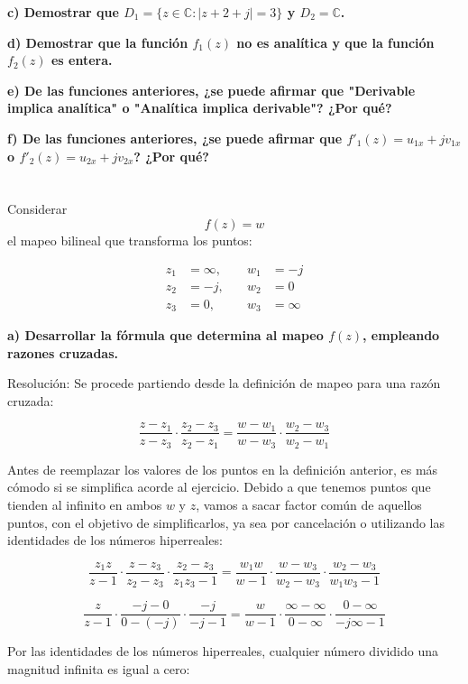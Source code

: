 \documentclass[12pt]{report}
\begin{document}
\textbf{c) Demostrar que $D_1 = \{z \in \mathbb{C} : |z + 2 + j| = 3\}$ y $D_2 = \mathbb{C}$.}

\textbf{d) Demostrar que la función $f_1(z)$ no es analítica y que la función $f_2(z)$ es entera.}

\textbf{e) De las funciones anteriores, ¿se puede afirmar que "Derivable implica analítica" o "Analítica implica derivable"? ¿Por qué?}

\textbf{f) De las funciones anteriores, ¿se puede afirmar que $f'_1(z) = u_{1x} + jv_{1x}$ o $f'_2(z) = u_{2x} + jv_{2x}$? ¿Por qué?}
\chapter{}

Considerar $$ f(z) = w $$ el mapeo bilineal que transforma los puntos:

\begin{align*}
    z_1 &= \infty, \quad & w_1 &= -j \\
    z_2 &= -j, \quad & w_2 &= 0 \\
    z_3 &= 0, \quad & w_3 &= \infty 
\end{align*}

\textbf{a) Desarrollar la fórmula que determina al mapeo \( f(z) \), empleando razones cruzadas.}

Resolución: Se procede partiendo desde la definición de mapeo para una razón cruzada:

$$ \frac{z - z_1}{z - z_3} \cdot \frac{z_2 - z_3}{z_2 - z_1} = \frac{w - w_1}{w - w_3} \cdot \frac{w_2 - w_3}{w_2 - w_1} $$

Antes de reemplazar los valores de los puntos en la definición anterior, es más cómodo si se simplifica acorde al ejercicio. Debido a que tenemos puntos que tienden al infinito en ambos \( w \) y \( z \), vamos a sacar factor común de aquellos puntos, con el objetivo de simplificarlos, ya sea por cancelación o utilizando las identidades de los números hiperreales:

$$ \frac{z_1z}{z - 1} \cdot \frac{z - z_3}{z_2 - z_3} \cdot \frac{z_2 - z_3}{z_1z_3 - 1} = \frac{w_1w}{w - 1} \cdot \frac{w - w_3}{w_2 - w_3} \cdot \frac{w_2 - w_3}{w_1w_3 - 1} $$

$$ \frac{z}{z - 1} \cdot \frac{-j - 0}{0 - (-j)} \cdot \frac{-j}{-j - 1} = \frac{w}{w - 1} \cdot \frac{\infty - \infty}{0 - \infty} \cdot \frac{0 - \infty}{-j\infty - 1} $$

Por las identidades de los números hiperreales, cualquier número dividido una magnitud infinita es igual a cero:
\end{document}
